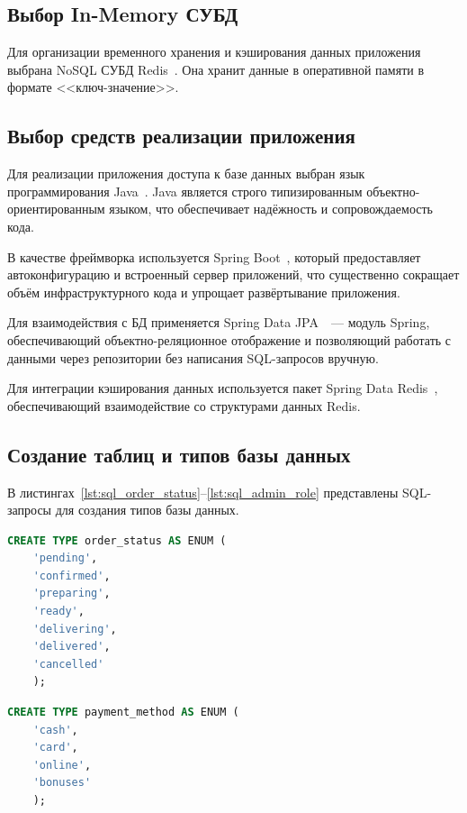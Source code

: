 \subsection{Выбор In-Memory СУБД}
Для организации временного хранения и кэширования данных приложения выбрана NoSQL СУБД Redis~\cite{redis}. Она хранит данные в оперативной памяти в формате <<ключ-значение>>.

\subsection{Выбор средств реализации приложения}
Для реализации приложения доступа к базе данных выбран язык программирования Java~\cite{java}. Java является строго типизированным объектно-ориентированным языком, что обеспечивает надёжность и сопровождаемость кода.

В качестве фреймворка используется Spring Boot~\cite{springboot}, который предоставляет автоконфигурацию и встроенный сервер приложений, что существенно сокращает объём инфраструктурного кода и упрощает развёртывание приложения.

Для взаимодействия с БД применяется Spring Data JPA~\cite{springdatajpa}~--- модуль Spring, обеспечивающий объектно-реляционное отображение и позволяющий работать с данными через репозитории без написания SQL-запросов вручную.

Для интеграции кэширования данных используется пакет Spring Data Redis~\cite{springdataredis}, обеспечивающий взаимодействие со структурами данных Redis.

\subsection{Создание таблиц и типов базы данных}

В листингах~\ref{lst:sql_order_status}--\ref{lst:sql_admin_role} представлены SQL-запросы для создания типов базы данных.

\begin{lstlisting}[caption={Создание типа \code{order\_status}}, label={lst:sql_order_status}, language=SQL]
CREATE TYPE order_status AS ENUM (
    'pending',
    'confirmed',
    'preparing',
    'ready',
    'delivering',
    'delivered',
    'cancelled'
    );
\end{lstlisting}

\begin{lstlisting}[caption={Создание типа \code{payment\_method}}, label={lst:sql_payment_method}, language=SQL]
CREATE TYPE payment_method AS ENUM (
    'cash',
    'card',
    'online',
    'bonuses'
    );
\end{lstlisting}

